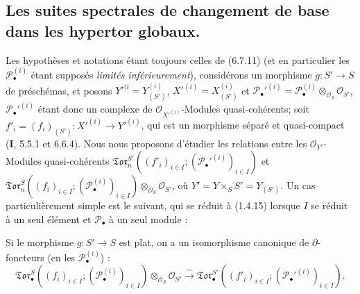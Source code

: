 \subsection{Les suites spectrales de changement de base dans les hypertor
globaux.}

\begin{env}[6.9.1]
Les hypothèses et notations étant toujours celles de (6.7.11) (et en
particulier les $\mathscr P_\bullet^{(i)}$ étant supposés \emph{limités
inférieurement}), considérons un morphisme $g:S'\to S$ de préschémas, et
posons
$Y'^{(i}=Y_{(S')}^{(i)}$, $X'^{(i)}=X_{(S')}^{(i)}$ et
$\mathscr P_\bullet'^{(i)}=
\mathscr P_\bullet^{(i)}\otimes_{\mathscr O_S}\mathscr O_{S'}$,
$\mathscr P_\bullet'^{(i)}$ étant donc un complexe de
$\mathscr O_{X'^{(i)}}$-Modules quasi-cohérents; soit
$f'_i=(f_i)_{(S')}:X'^{(i)}\to Y'^{(i)}$, qui est un morphisme séparé et
quasi-compact (\textbf{I}, 5.5.1 et 6.6.4). Nous nous proposons d'étudier les relations
entre les $\mathscr O_{Y'}$-Modules quasi-cohérents
$\mathfrak{Tor}_n^{S'}((f'_i)_{i\in I};
(\mathscr P_\bullet'^{(i)})_{i\in I})$ et
$\mathfrak{Tor}_n^S((f_i)_{i\in I};
(\mathscr P_\bullet^{(i)})_{i\in I})
\otimes_{\mathscr O_S}\mathscr O_{S'}$, où
$Y'=Y\times_S S'=Y_{(S')}$. Un cas particulièrement simple est le suivant,
qui se réduit à (1.4.15) lorsque $I$ se réduit à un seul élément et
$\mathscr P_\bullet$ à un seul module :
\end{env}

\begin{proposition}[6.9.2]
Si le morphisme $g:S'\to S$ est plat, on a un isomorphisme canonique de
$\partial$-foncteurs (en les $\mathscr P_\bullet^{(i)}$) :
\[
  \mathfrak{Tor}_\bullet^S
  ((f_i)_{i\in I};(\mathscr P_\bullet^{(i)})_{i\in I})
  \otimes_{\mathscr O_S}\mathscr O_{S'}
  \xrightarrow{\sim}
  \mathfrak{Tor}_\bullet^{S'}
  ((f'_i)_{i\in I};(\mathscr P_\bullet'^{(i)})_{i\in I}).
  \tag{6.9.2.1}\label{III.6.9.2.1.fr}
\]
\end{proposition}

